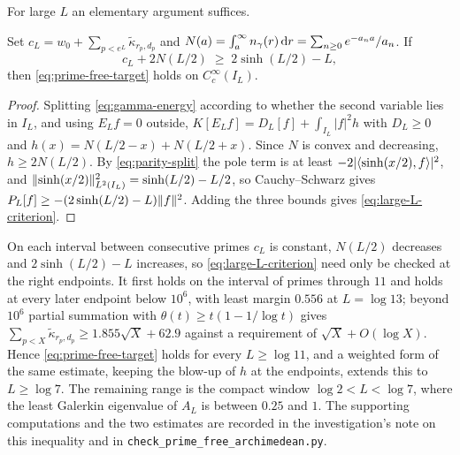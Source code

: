 For large $L$ an elementary argument suffices.

\begin{proposition}\label{prop:prime-free-large-L}
Set $c_L=w_0+\sum_{p<e^L}\widetilde\kappa_{r_p,d_p}$ and
$N(a)=\int_a^\infty n_{\gamma}(r)\,\mathrm d r=\sum_{n\geq0}e^{-a_na}/a_n$. If
\begin{equation}\label{eq:large-L-criterion}
 c_L+2N(L/2)\;\geq\;2\sinh(L/2)-L,
\end{equation}
then \eqref{eq:prime-free-target} holds on $C_c^\infty(I_L)$.
\end{proposition}
\begin{proof}
Splitting \eqref{eq:gamma-energy} according to whether the second variable lies
in $I_L$, and using $E_Lf=0$ outside,
$K[E_Lf]=D_L[f]+\int_{I_L}|f|^2h$ with $D_L\geq0$ and
$h(x)=N(L/2-x)+N(L/2+x)$. Since $N$ is convex and decreasing,
$h\geq2N(L/2)$. By \eqref{eq:parity-split} the pole term is at least
$-2|\langle \sinh(x/2),f\rangle|^2$, and
$\lVert \sinh(x/2)\rVert_{L^2(I_L)}^2=\sinh(L/2)-L/2$, so Cauchy--Schwarz gives
$P_L[f]\geq-(2\sinh(L/2)-L)\lVert f\rVert^2$. Adding the three bounds gives
\eqref{eq:large-L-criterion}.
\end{proof}

On each interval between consecutive primes $c_L$ is constant, $N(L/2)$
decreases and $2\sinh(L/2)-L$ increases, so \eqref{eq:large-L-criterion} need
only be checked at the right endpoints. It first holds on the interval of
primes through $11$ and holds at every later endpoint below $10^6$, with least
margin $0.556$ at $L=\log13$; beyond $10^6$ partial summation with
$\theta(t)\geq t(1-1/\log t)$ gives
$\sum_{p<X}\widetilde\kappa_{r_p,d_p}\geq1.855\sqrt X+62.9$ against a
requirement of $\sqrt X+O(\log X)$. Hence \eqref{eq:prime-free-target} holds
for every $L\geq\log11$, and a weighted form of the same estimate, keeping the
blow-up of $h$ at the endpoints, extends this to $L\geq\log7$. The remaining
range is the compact window $\log2<L<\log7$, where the least Galerkin
eigenvalue of $A_L$ is between $0.25$ and $1$. The supporting computations and
the two estimates are recorded in the investigation's note on this inequality
and in \texttt{check\_prime\_free\_archimedean.py}.

